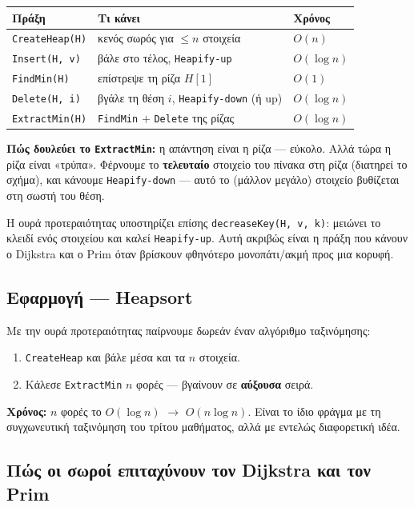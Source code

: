 \documentclass[11pt,a4paper]{article}
\begin{document}
\begin{center}
\begin{tabular}{@{}l p{6.2cm} l@{}}
\toprule
Πράξη & Τι κάνει & Χρόνος \\
\midrule
\texttt{CreateHeap(H)} & κενός σωρός για $\le n$ στοιχεία & $O(n)$ \\
\texttt{Insert(H, v)}  & βάλε στο τέλος, \texttt{Heapify-up} & $O(\log n)$ \\
\texttt{FindMin(H)}    & επίστρεψε τη ρίζα $H[1]$ & $O(1)$ \\
\texttt{Delete(H, i)}  & βγάλε τη θέση $i$, \texttt{Heapify-down} (ή up) &
$O(\log n)$ \\
\texttt{ExtractMin(H)} & \texttt{FindMin} $+$ \texttt{Delete} της ρίζας &
$O(\log n)$ \\
\bottomrule
\end{tabular}
\end{center}

\begin{intuition}
\textbf{Πώς δουλεύει το \texttt{ExtractMin}:} η απάντηση είναι η ρίζα ---
εύκολο. Αλλά τώρα η ρίζα είναι «τρύπα». Φέρνουμε το \textbf{τελευταίο} στοιχείο
του πίνακα στη ρίζα (διατηρεί το σχήμα), και κάνουμε \texttt{Heapify-down} ---
αυτό το (μάλλον μεγάλο) στοιχείο βυθίζεται στη σωστή του θέση.
\end{intuition}

Η ουρά προτεραιότητας υποστηρίζει επίσης \texttt{decreaseKey(H, v, k)}: μειώνει
το κλειδί ενός στοιχείου και καλεί \texttt{Heapify-up}. Αυτή ακριβώς είναι η
πράξη που κάνουν ο Dijkstra και ο Prim όταν βρίσκουν φθηνότερο μονοπάτι/ακμή προς
μια κορυφή.

\subsection{Εφαρμογή --- Heapsort}

Με την ουρά προτεραιότητας παίρνουμε δωρεάν έναν αλγόριθμο ταξινόμησης:
\begin{enumerate}
  \item \texttt{CreateHeap} και βάλε μέσα και τα $n$ στοιχεία.
  \item Κάλεσε \texttt{ExtractMin} $n$ φορές --- βγαίνουν σε \textbf{αύξουσα}
  σειρά.
\end{enumerate}
\textbf{Χρόνος:} $n$ φορές το $O(\log n)$ $\to$ \textbf{$O(n \log n)$}. Είναι το
ίδιο φράγμα με τη συγχωνευτική ταξινόμηση του τρίτου μαθήματος, αλλά με εντελώς
διαφορετική ιδέα.

\subsection{Πώς οι σωροί επιταχύνουν τον Dijkstra και τον Prim}
\end{document}
